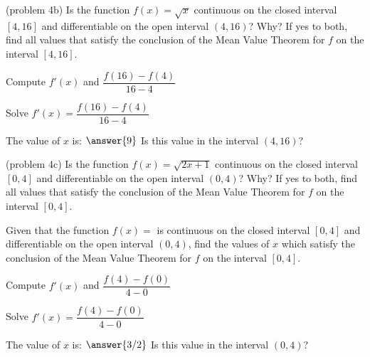 \documentclass[handout]{ximera}
\begin{document}
\begin{problem}(problem 4b)
  Is the function $f(x) = \sqrt x$ continuous on the closed interval $[4,16]$ and differentiable on the open interval $(4,16)$? Why?
  If yes to both, find all values that satisfy the conclusion of the Mean Value Theorem for $f$ on the interval $[4,16]$.
	
    \begin{hint}
      Compute $f'(x)$ and $\dfrac{f(16) - f(4)}{16-4}$
    \end{hint}
		\begin{hint}
		  Solve $f'(x) = \dfrac{f(16) - f(4)}{16-4}$
		\end{hint}
		
		The value of $x$ is:
		 $\answer{9}$
     Is this value in the interval $(4,16)$?
\end{problem}


\begin{problem}(problem 4c)
  Is the function $f(x) = \sqrt{2x+1}$ continuous on the closed interval $[0,4]$ and differentiable on the open interval $(0,4)$? Why?
  If yes to both, find all values that satisfy the conclusion of the Mean Value Theorem for $f$ on the interval $[0,4]$.


  Given that the function $f(x) = $ is continuous on the closed interval $[0,4]$ and differentiable on the open interval $(0,4)$,
  find the values of $x$ which satisfy the conclusion of the Mean Value Theorem for $f$ on the interval $[0,4]$.
	
    \begin{hint}
      Compute $f'(x)$ and $\dfrac{f(4) - f(0)}{4-0}$
    \end{hint}
		\begin{hint}
		  Solve $f'(x) = \dfrac{f(4) - f(0)}{4-0}$
		\end{hint}
		
		The value of $x$ is:
		 $\answer{3/2}$
     Is this value in the interval $(0,4)$?
\end{problem}
\end{document}
